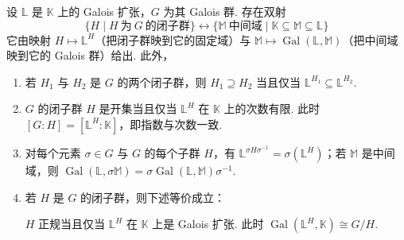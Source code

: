 \begin{theorem}\label{c2-thm-3-3}
设 $\mathbb{L}$ 是 $\mathbb{K}$ 上的 Galois 扩张，$G$ 为其 Galois 群. 存在双射
\[
\{H\mid H\ \text{为}\ G\ \text{的闭子群}\}\leftrightarrow\{\mathbb{M}\ \text{中间域}\mid\mathbb{K}\subseteq\mathbb{M}\subseteq\mathbb{L}\}
\]
它由映射 $H\mapsto\mathbb{L}^{H}$（把闭子群映到它的固定域）与 $\mathbb{M}\mapsto\operatorname{Gal}(\mathbb{L},\mathbb{M})$（把中间域映到它的 Galois 群）给出. 此外，
\begin{enumerate}
    \item 若 $H_{1}$ 与 $H_{2}$ 是 $G$ 的两个闭子群，则 $H_{1}\supseteq H_{2}$ 当且仅当 $\mathbb{L}^{H_{1}}\subseteq\mathbb{L}^{H_{2}}$.
    \item $G$ 的闭子群 $H$ 是开集当且仅当 $\mathbb{L}^{H}$ 在 $\mathbb{K}$ 上的次数有限. 此时 $[G:H]=[\mathbb{L}^{H}:\mathbb{K}]$，即指数与次数一致.
    \item 对每个元素 $\sigma\in G$ 与 $G$ 的每个子群 $H$，有 $\mathbb{L}^{\sigma H\sigma^{-1}}=\sigma(\mathbb{L}^{H})$；若 $\mathbb{M}$ 是中间域，则 $\operatorname{Gal}(\mathbb{L},\sigma\mathbb{M})=\sigma\operatorname{Gal}(\mathbb{L},\mathbb{M})\sigma^{-1}$.
    \item 若 $H$ 是 $G$ 的闭子群，则下述等价成立：

    $H$ 正规当且仅当 $\mathbb{L}^{H}$ 在 $\mathbb{K}$ 上是 Galois 扩张. 此时 $\operatorname{Gal}(\mathbb{L}^{H},\mathbb{K})\cong G/H$.
\end{enumerate}
\end{theorem}

